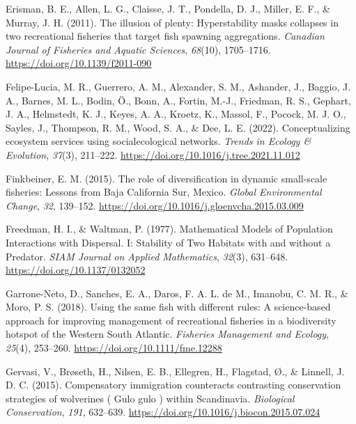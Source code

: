 \documentclass[
  12pt,
]{article}
\newlength{\cslhangindent}
\newlength{\cslentryspacingunit} %
\newenvironment{CSLReferences}[2] %
 {%
  \setlength{\parindent}{0pt}
  \ifodd #1
  \let\oldpar\par
  \def\par{\hangindent=\cslhangindent\oldpar}
  \fi
  \setlength{\parskip}{#2\cslentryspacingunit}
 }%
 {}
\begin{document}
\begin{CSLReferences}{1}{2}
\leavevmode{}%
Erisman, B. E., Allen, L. G., Claisse, J. T., Pondella, D. J., Miller, E. F., \& Murray, J. H. (2011). The illusion of plenty: Hyperstability masks collapses in two recreational fisheries that target fish spawning aggregations. \emph{Canadian Journal of Fisheries and Aquatic Sciences}, \emph{68}(10), 1705--1716. \url{https://doi.org/10.1139/f2011-090}

\leavevmode{}%
Felipe-Lucia, M. R., Guerrero, A. M., Alexander, S. M., Ashander, J., Baggio, J. A., Barnes, M. L., Bodin, Ö., Bonn, A., Fortin, M.-J., Friedman, R. S., Gephart, J. A., Helmstedt, K. J., Keyes, A. A., Kroetz, K., Massol, F., Pocock, M. J. O., Sayles, J., Thompson, R. M., Wood, S. A., \& Dee, L. E. (2022). Conceptualizing ecosystem services using social\textendash ecological networks. \emph{Trends in Ecology \& Evolution}, \emph{37}(3), 211--222. \url{https://doi.org/10.1016/j.tree.2021.11.012}

\leavevmode{}%
Finkbeiner, E. M. (2015). The role of diversification in dynamic small-scale fisheries: {Lessons} from {Baja California Sur}, {Mexico}. \emph{Global Environmental Change}, \emph{32}, 139--152. \url{https://doi.org/10.1016/j.gloenvcha.2015.03.009}

\leavevmode{}%
Freedman, H. I., \& Waltman, P. (1977). Mathematical {Models} of {Population Interactions} with {Dispersal}. {I}: {Stability} of {Two Habitats} with and without a {Predator}. \emph{SIAM Journal on Applied Mathematics}, \emph{32}(3), 631--648. \url{https://doi.org/10.1137/0132052}

\leavevmode{}%
Garrone-Neto, D., Sanches, E. A., Daros, F. A. L. de M., Imanobu, C. M. R., \& Moro, P. S. (2018). Using the same fish with different rules: {A} science-based approach for improving management of recreational fisheries in a biodiversity hotspot of the {Western South Atlantic}. \emph{Fisheries Management and Ecology}, \emph{25}(4), 253--260. \url{https://doi.org/10.1111/fme.12288}

\leavevmode{}%
Gervasi, V., Brøseth, H., Nilsen, E. B., Ellegren, H., Flagstad, Ø., \& Linnell, J. D. C. (2015). Compensatory immigration counteracts contrasting conservation strategies of wolverines ( {Gulo} gulo ) within {Scandinavia}. \emph{Biological Conservation}, \emph{191}, 632--639. \url{https://doi.org/10.1016/j.biocon.2015.07.024}


\end{CSLReferences}
\end{document}
